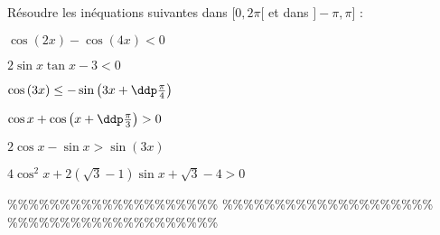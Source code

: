 



\begin{exercice}  \;
R\'esoudre les in\'equations suivantes dans $\lbrack 0,2\pi\lbrack$ et dans $\rbrack -\pi,\pi\rbrack$ :
\begin{enumerate}
\begin{minipage}[t]{0.45\textwidth}
\item $\cos{(2x)}-\cos{(4x)}<0$
\item $2\sin{x}\tan{x}-3<0$
\item $\cos{(3x)}\leq -\sin{\left(3x+\ddp\frac{\pi}{4}\right)}$
\end{minipage}
\begin{minipage}[t]{0.45\textwidth}
\item $\cos{x}+\cos{\left(x+\ddp\frac{\pi}{3}\right)}>0$
\item $2\cos{x}-\sin{x}>\sin{(3x)}$
\item $4\cos^2{x}+2(\sqrt{3}-1)\sin{x}+\sqrt{3}-4>0$
\end{minipage}
\end{enumerate}
\end{exercice}


\%\%\%\%\%\%\%\%\%\%\%\%\%\%\%\%\%\%\%\%
\%\%\%\%\%\%\%\%\%\%\%\%\%\%\%\%\%\%\%\%
\%\%\%\%\%\%\%\%\%\%\%\%\%\%\%\%\%\%\%\%




